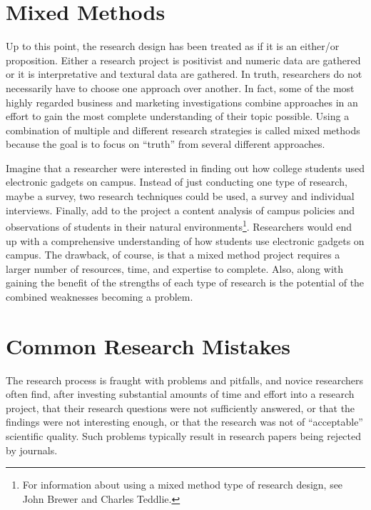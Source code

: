 \section{Mixed Methods}

Up to this point, the research design has been treated as if it is an either/or proposition. Either a research project is positivist and numeric data are gathered or it is interpretative and textural data are gathered. In truth, researchers do not necessarily have to choose one approach over another. In fact, some of the most highly regarded business and marketing investigations combine approaches in an effort to gain the most complete understanding of their topic possible. Using a combination of multiple and different research strategies is called mixed methods because the goal is to focus on ``truth'' from several different approaches.

Imagine that a researcher were interested in finding out how college students used electronic gadgets on campus. Instead of just conducting one type of research, maybe a survey, two research techniques could be used, a survey and individual interviews. Finally, add to the project a content analysis of campus policies and observations of students in their natural environments\footnote{For information about using a mixed method type of research design, see John Brewer\cite{brewer1989multimethod} and Charles Teddlie\cite{teddlie2006general}.}. Researchers would end up with a comprehensive understanding of how students use electronic gadgets on campus. The drawback, of course, is that a mixed method project requires a larger number of resources, time, and expertise to complete. Also, along with gaining the benefit of the strengths of each type of research is the potential of the combined weaknesses becoming a problem.

\section{Common Research Mistakes}

The research process is fraught with problems and pitfalls, and novice researchers often find, after investing substantial amounts of time and effort into a research project, that their research questions were not sufficiently answered, or that the findings were not interesting enough, or that the research was not of ``acceptable'' scientific quality. Such problems typically result in research papers being rejected by journals.

